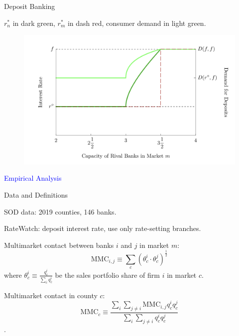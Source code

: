 \documentclass[notes,10.2pt, aspectratio=169]{beamer}
\newenvironment{wideitemize}{\itemize\addtolength{\itemsep}{10pt}}{\enditemize}
\begin{document}
    
\begin{frame}{ Deposit Banking}
  \begin{wideitemize}

    \item $r^*_n$ in dark green, $r^*_m$ in dash red, consumer demand in light green. 
    \begin{figure}[t*]
      \centering
      \includegraphics[width=.7\textwidth]{./imgs/figure9.png}
    \end{figure}

  
  \end{wideitemize}
\end{frame}


\begin{frame}[noframenumbering]
    \textcolor{blue}{\huge{\centerline{Empirical Analysis}}}
\end{frame}

\begin{frame}{Data and Definitions}
    \vspace{0.2cm}

    \begin{wideitemize}

    \item SOD data: 2019 counties, 146 banks.
    \item RateWatch: deposit interest rate, use only rate-setting branches. 
    \item Multimarket contact between banks $i$ and $j$ in market $m$:
    $$\mathrm{MMC}_{i, j} \equiv \sum_c\left(\theta_c^i \cdot \theta_c^j\right)^{\frac{1}{2}}$$
    where $\theta_c^i \equiv \frac{q_c^i}{\sum_{\bar{c}} q_{\bar{c}}^i}$ be the sales portfolio share of firm $i$ in market $c$.

    \item Multimarket contact in county $c$:
    $$\mathrm{MMC}_c \equiv \frac{\sum_i \sum_{j \neq i} \mathrm{MMC}_{i, j} q_c^i q_c^j}{\sum_i \sum_{j \neq i} q_c^i q_c^j}$$.

  \end{wideitemize}
\end{frame}
\end{document}
